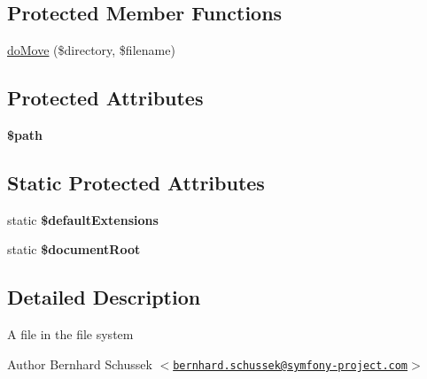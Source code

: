 \subsection*{\-Protected \-Member \-Functions}
\begin{DoxyCompactItemize}
\item 
\hyperlink{class_symfony_1_1_component_1_1_http_foundation_1_1_file_1_1_file_ad552ce07f8efd83237ad1ad0a28e98ce}{do\-Move} (\$directory, \$filename)
\end{DoxyCompactItemize}
\subsection*{\-Protected \-Attributes}
\begin{DoxyCompactItemize}
\item 
\hypertarget{class_symfony_1_1_component_1_1_http_foundation_1_1_file_1_1_file_a0a4baf0b22973c07685c3981f0d17fc4}{
{\bfseries \$path}}
\label{class_symfony_1_1_component_1_1_http_foundation_1_1_file_1_1_file_a0a4baf0b22973c07685c3981f0d17fc4}

\end{DoxyCompactItemize}
\subsection*{\-Static \-Protected \-Attributes}
\begin{DoxyCompactItemize}
\item 
\hypertarget{class_symfony_1_1_component_1_1_http_foundation_1_1_file_1_1_file_a818316907462117893277562ecad9f2a}{
static {\bfseries \$default\-Extensions}}
\label{class_symfony_1_1_component_1_1_http_foundation_1_1_file_1_1_file_a818316907462117893277562ecad9f2a}

\item 
\hypertarget{class_symfony_1_1_component_1_1_http_foundation_1_1_file_1_1_file_a2c1581c2861b3f2e2e838d051fae837b}{
static {\bfseries \$document\-Root}}
\label{class_symfony_1_1_component_1_1_http_foundation_1_1_file_1_1_file_a2c1581c2861b3f2e2e838d051fae837b}

\end{DoxyCompactItemize}


\subsection{\-Detailed \-Description}
\-A file in the file system

\begin{DoxyAuthor}{\-Author}
\-Bernhard \-Schussek $<$\href{mailto:bernhard.schussek@symfony-project.com}{\tt bernhard.\-schussek@symfony-\/project.\-com}$>$ 
\end{DoxyAuthor}


